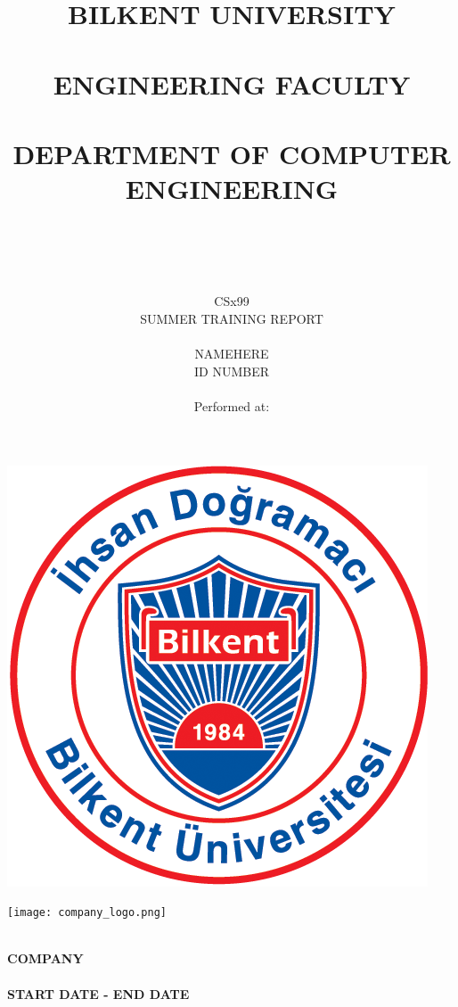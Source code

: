 \documentclass[10pt]{article}
\title{BILKENT UNIVERSITY \\ ~\\ ENGINEERING FACULTY \\ ~\\
DEPARTMENT OF COMPUTER ENGINEERING \\ ~\\ ~\\}
\author{CSx99 \\ SUMMER TRAINING REPORT \\ ~\\ NAMEHERE \\ ID NUMBER \\ ~\\ Performed at: }
\begin{document}
\begin{titlingpage} %
    \begin{center}
        \begin{large}
            \textbf{\thetitle} %
        \end{large}

        \includegraphics[scale=1.3]{bilkent_logo.png}\\ %

        \begin{LARGE}
            \textbf{\theauthor} %
        \end{LARGE}

        \texttt{[image: company\_logo.png]} %

        \begin{Large}
            \textbf{\\ COMPANY ~\\}
            \textbf{\\ START DATE - END DATE}
        \end{Large}
    \end{center}
\end{titlingpage}
\end{document}
